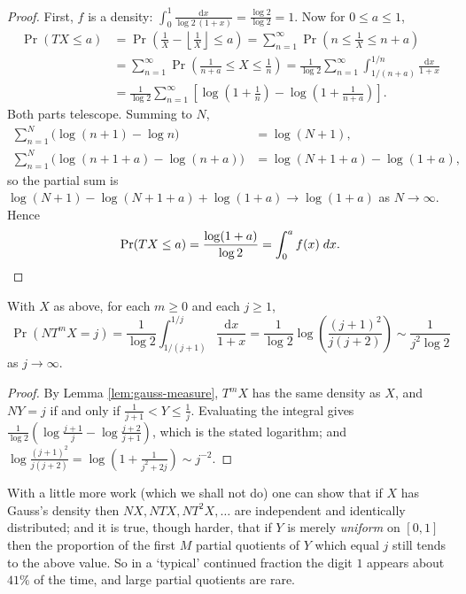 \documentclass[a4paper]{scrartcl}
\newcommand{\floor}[1]{\left\lfloor #1 \right\rfloor}
\begin{document}
\begin{proof}
	First, $f$ is a density: $\int_0^1\frac{\mathrm dx}{\log2\,(1+x)} = \frac{\log2}{\log2}=1$. Now for $0\leq a\leq 1$,
	\begin{align*}
		\Pr(TX\leq a) &= \Pr\left(\frac1X - \floor{\frac1X}\leq a\right) = \sum_{n=1}^\infty\Pr\left(n\leq\frac1X\leq n+a\right) \\
		&= \sum_{n=1}^\infty\Pr\left(\frac{1}{n+a}\leq X\leq\frac1n\right) = \frac{1}{\log2}\sum_{n=1}^\infty\int_{1/(n+a)}^{1/n}\frac{\mathrm dx}{1+x} \\
		&= \frac{1}{\log2}\sum_{n=1}^\infty\left[\log\left(1+\frac1n\right)-\log\left(1+\frac{1}{n+a}\right)\right].
	\end{align*}
	Both parts telescope. Summing to $N$,
	\begin{align*}
		\sum_{n=1}^N\big(\log(n+1)-\log n\big) &= \log(N+1), \\
		\sum_{n=1}^N\big(\log(n+1+a)-\log(n+a)\big) &= \log(N+1+a)-\log(1+a),
	\end{align*}
	so the partial sum is $\log(N+1)-\log(N+1+a)+\log(1+a) \to \log(1+a)$ as $N\to\infty$. Hence
	$$\Pr(TX\leq a) = \frac{\log(1+a)}{\log2} = \int_0^af(x)\; d x. \qedhere$$
\end{proof}

\begin{corollary}
	With $X$ as above, for each $m\geq0$ and each $j\geq1$,
	$$\Pr(NT^mX = j) = \frac{1}{\log2}\int_{1/(j+1)}^{1/j}\frac{\mathrm dx}{1+x} = \frac{1}{\log2}\log\left(\frac{(j+1)^2}{j(j+2)}\right) \sim \frac{1}{j^2\log 2}$$
	as $j\to\infty$.
\end{corollary}

\begin{proof}
	By Lemma \ref{lem:gauss-measure}, $T^mX$ has the same density as $X$, and $NY = j$ if and only if $\frac{1}{j+1}<Y\leq\frac1j$. Evaluating the integral gives $\frac{1}{\log2}\left(\log\frac{j+1}{j}-\log\frac{j+2}{j+1}\right)$, which is the stated logarithm; and $\log\frac{(j+1)^2}{j(j+2)} = \log\left(1+\frac{1}{j^2+2j}\right)\sim j^{-2}$.
\end{proof}

With a little more work (which we shall not do) one can show that if $X$ has Gauss's density then $NX, NTX, NT^2X,\ldots$ are independent and identically distributed; and it is true, though harder, that if $Y$ is merely \emph{uniform} on $[0,1]$ then the proportion of the first $M$ partial quotients of $Y$ which equal $j$ still tends to the above value. So in a `typical' continued fraction the digit $1$ appears about $41\%$ of the time, and large partial quotients are rare.
\end{document}
